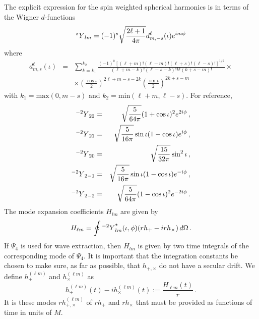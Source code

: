 \documentclass[10pt]{ligodcc}
\begin{document}
The explicit expression for the spin weighted spherical harmonics is
in terms of the Wigner $d$-functions
\begin{equation}
  \label{eq:5}
   {{}^sY}_{lm} = (-1)^s\sqrt{\frac{2\ell+1}{4\pi}} d^\ell_{m,-s}(\iota)e^{im\phi}
\end{equation}
where
\begin{eqnarray}
  \label{eq:6}
  d^\ell_{m,s}(\iota) &=& \sum_{k = k_1}^{k_2}
    \frac{(-1)^k[(\ell+m)!(\ell-m)!(\ell+s)!(\ell-s)!]^{1/2}}{(\ell +m
      -k)!(\ell-s-k)!k!(k+s-m)!} \times \\ 
    &&\times \left(\frac{\cos\iota}{2}\right)^{2\ell+m-s-2k}\left(\frac{\sin\iota}{2}\right)^{2k+s-m}  
\end{eqnarray}
with $k_1 = \textrm{max}(0, m-s)$ and $k_2=\textrm{min}(\ell+m,
\ell-s)$.  For reference,
\begin{eqnarray}
  \label{eq:7}
  {{}^{-2}Y}_{22} &=& \sqrt{\frac{5}{64\pi}}(1+\cos\iota)^2e^{2i\phi} \,,\\
  {{}^{-2}Y}_{21} &=& \sqrt{\frac{5}{16\pi}}  \sin\iota( 1 - \cos\iota )e^{i\phi} \,,\\
  {{}^{-2}Y}_{20} &=& \sqrt{\frac{15}{32\pi}} \sin^2\iota \,,\\
  {{}^{-2}Y}_{2-1} &=& \sqrt{\frac{5}{16\pi}}  \sin\iota( 1 - \cos\iota
  )e^{-i\phi} \,,\\
  {{}^{-2}Y}_{2-2} &=& \sqrt{\frac{5}{64\pi}}(1-\cos\iota)^2e^{-2i\phi}\,.
\end{eqnarray}
The mode expansion coefficients $H_{lm}$ are given by
\begin{equation}
  \label{eq:10}
  H_{\ell m} = \oint {{}^{-2}Y}_{lm}^\star(\iota,\phi)(rh_+-irh_\times )\,d\Omega\,.
\end{equation}
If $\Psi_4$ is used for wave extraction, then $H_{lm}$ is given by two
time integrals of the corresponding mode of $\Psi_4$.  It is important
that the integration constants be chosen to make sure, as far as
possible, that $h_{+,\times}$ do not have a secular drift. 
We define $h_+^{(\ell m)}$ and $h_\times^{(\ell m)}$ as
\begin{equation}
  \label{eq:11}
  h_+^{(\ell m)}(t) -ih_\times^{(\ell m)}(t) := \frac{H_{\ell m}(t)}{r}\,.  
\end{equation}
It is these modes $rh_{+,\times}^{(\ell m)}$ of $rh_+$ and $rh_\times$ that must be
provided as functions of time in units of $M$.
\end{document}

